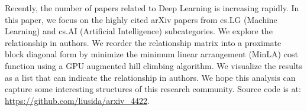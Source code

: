 Recently, the number of papers related to Deep Learning is increasing rapidly.
In this paper, we focus on the highly cited arXiv papers from cs.LG (Machine Learning) and cs.AI (Artificial Intelligence) subcategories.
We explore the relationship in authors.
We reorder the relationship matrix into a proximate block diagonal form by minimize the minimum linear arrangement (MinLA) cost function using a GPU augmented hill climbing algorithm.
We visualize the results as a list that can indicate the relationship in authors.
We hope this analysis can capture some interesting structures of this research community.
Source code is at: \url{https://github.com/liusida/arxiv_4422}.
